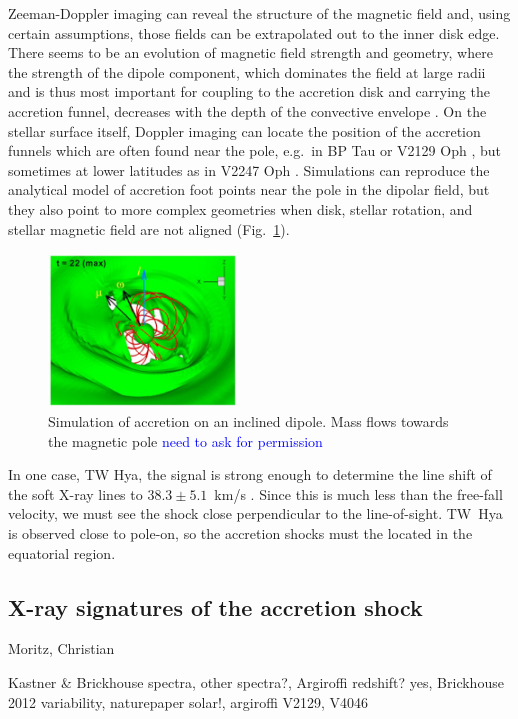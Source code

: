 Zeeman-Doppler imaging can reveal the structure of the magnetic field and, using certain assumptions, those fields can be extrapolated out to the inner disk edge. There seems to be an evolution of magnetic field strength and geometry, where the strength of the dipole component, which dominates the field at large radii and is thus most important for coupling to the accretion disk and carrying the accretion funnel, decreases with the depth of the convective envelope \cite{2012ApJ...755...97G,2019A&A...622A..72V}. On the stellar surface itself, Doppler imaging can locate the position of the accretion funnels which are often found near the pole, e.g.\ in BP Tau \cite{2008MNRAS.386.1234D} or V2129 Oph \cite{2011A&A...530A...1A}, but sometimes at lower latitudes as in V2247 Oph \cite{2010MNRAS.402.1426D}. Simulations can reproduce the analytical model of accretion foot points near the pole in the dipolar field, but they also point to more complex geometries when disk, stellar rotation, and stellar magnetic field are not aligned (Fig.~\ref{fig:romanova}).

\begin{figure}[t]
\centering
\includegraphics[width=5cm]{figs/Romanova2021fig8-panel.png}
\caption{Simulation of accretion on an inclined dipole. Mass flows towards the magnetic pole \cite{2021MNRAS.506..372R} \textcolor{blue}{need to ask for permission} \label{fig:romanova}}
\end{figure}

In one case, TW Hya, the signal is strong enough to determine the line shift of the soft X-ray lines to $38.3 \pm 5.1$~km/s \cite{2017A&A...607A..14A}. Since this is much less than the free-fall velocity, we must see the shock close perpendicular to the line-of-sight. TW~Hya is observed close to pole-on, so the accretion shocks must the located in the equatorial region.




\subsection{X-ray signatures of the accretion shock}
\label{sect:accretionobs}
{\color{blue}Moritz, Christian

Kastner & Brickhouse spectra, other spectra?, Argiroffi redshift? yes, Brickhouse 2012 variability,  naturepaper solar!, argiroffi V2129, V4046}


